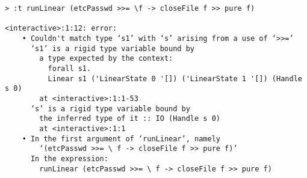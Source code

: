 \begin{repl}\begin{lstlisting}
> :t runLinear (etcPasswd >>= \f -> closeFile f >> pure f)

<interactive>:1:12: error:
    • Couldn't match type ‘s1’ with ‘s’ arising from a use of ‘>>=’
      ‘s1’ is a rigid type variable bound by
        a type expected by the context:
          forall s1.
          Linear s1 ('LinearState 0 '[]) ('LinearState 1 '[]) (Handle s 0)
        at <interactive>:1:1-53
      ‘s’ is a rigid type variable bound by
        the inferred type of it :: IO (Handle s 0)
        at <interactive>:1:1
    • In the first argument of ‘runLinear’, namely
        ‘(etcPasswd >>= \ f -> closeFile f >> pure f)’
      In the expression:
        runLinear (etcPasswd >>= \ f -> closeFile f >> pure f)\end{lstlisting}\end{repl}
